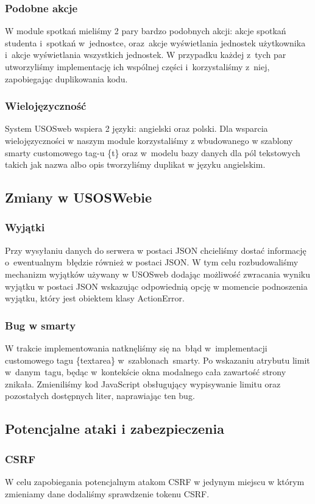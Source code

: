 \documentclass[licencjacka]{pracamgr}
\begin{document}
\subsubsection{Podobne akcje}
W module spotkań mieliśmy 2 pary bardzo podobnych akcji: akcje spotkań studenta i~spotkań w~jednostce, oraz~akcje wyświetlania jednostek użytkownika i~akcje wyświetlania wszystkich jednostek. W przypadku każdej z~tych par utworzyliśmy implementację ich wspólnej części i~korzystaliśmy z~niej, zapobiegając duplikowania kodu.
\subsubsection{Wielojęzyczność}
System USOSweb wspiera 2 języki: angielski oraz polski. Dla wsparcia wielojęzyczności w naszym module korzystaliśmy z wbudowanego w szablony smarty customowego tag-u \{t\} oraz w~modelu bazy danych dla pól tekstowych takich jak nazwa albo opis tworzyliśmy duplikat w języku angielskim.
\subsection{Zmiany w USOSWebie}
\subsubsection{Wyjątki}
Przy wysyłaniu danych do serwera w postaci JSON chcieliśmy dostać informację o~ewentualnym~błędzie również w postaci JSON. W tym celu rozbudowaliśmy mechanizm wyjątków używany w USOSweb dodając możliwość zwracania wyniku wyjątku w postaci JSON wskazując odpowiednią opcję w momencie podnoszenia wyjątku, który jest obiektem klasy ActionError.
\subsubsection{Bug w smarty}
W trakcie implementowania natknęliśmy się na~błąd w~implementacji customowego tagu \{textarea\} w~szablonach~smarty. Po wskazaniu atrybutu limit w~danym~tagu, będąc w~kontekście okna modalnego cała zawartość strony znikała. Zmieniliśmy kod JavaScript obsługujący wypisywanie limitu oraz pozostałych dostępnych liter, naprawiając ten bug.
\subsection{Potencjalne ataki i zabezpieczenia} \label{subsec:bezpiecz}
\subsubsection{CSRF}
W celu zapobiegania potencjalnym atakom CSRF w jedynym miejscu w którym zmieniamy dane dodaliśmy sprawdzenie tokenu CSRF.
\end{document}
